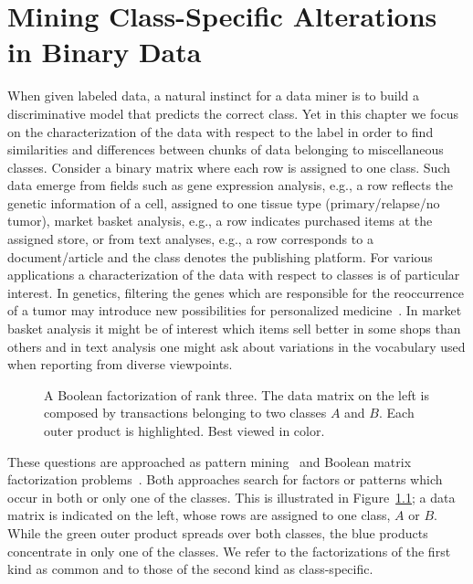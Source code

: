 \chapter{Mining Class-Specific Alterations in Binary Data}\label{chap:CSalt}
When given labeled data, a natural instinct for a data miner is to build a discriminative model that predicts the correct class.
Yet in this chapter we focus on the characterization of the data with respect to the label in order to find similarities and differences between chunks of data belonging to miscellaneous classes.
Consider a binary matrix where each row is assigned to one class. Such data emerge from fields such as gene expression analysis, e.g., a row reflects the genetic information of a cell, assigned to one tissue type (primary/relapse/no tumor), market basket analysis, e.g., a row indicates purchased items at the assigned store, or from text analyses, e.g., a row corresponds to a document/article and the class denotes the publishing platform. For various applications a characterization of the data with respect to classes is of particular interest. In genetics, filtering the genes which are responsible for the reoccurrence of a tumor may introduce new possibilities for personalized medicine~\citep{schramm2015mutational}. In market basket analysis it might be of interest which items sell better in some shops  than others and in text analysis one might ask about variations in the vocabulary used when reporting from diverse viewpoints.
 \begin{figure}
 \centering
 
 \caption{A Boolean factorization of rank three. The data matrix on the left is composed by transactions belonging to two classes $A$ and $B$. Each outer product is highlighted. Best viewed in color.}
 \label{fig:classFact}
 \end{figure}

These questions are approached as pattern mining~\citep{vreeken2007characterising} and Boolean matrix factorization problems~\citep{miettienen2012finding}. Both approaches search for factors or patterns which occur in both or only one of the classes. This is illustrated in Figure~\ref{fig:classFact}; a data matrix is indicated on the left, whose rows are assigned to one class, $A$ or $B$. While the green outer product spreads over both classes, the blue products concentrate in only one of the classes. We refer to the factorizations of the first kind as common and to those of the second kind as class-specific.

